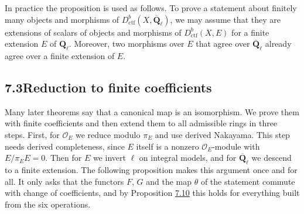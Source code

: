 \documentclass[11pt]{article}
\begin{document}
\label{bp631}%
In practice the proposition is used as follows. To prove a statement about finitely many objects and morphisms of \(D^b_{\mathrm{ctf}}(X,\overline{\mathbf Q}_\ell)\), we may assume that they are extensions of scalars of objects and morphisms of \(D^b_{\mathrm{ctf}}(X,E)\) for a finite extension \(E\) of \(\mathbf Q_\ell\). Moreover, two morphisms over \(E\) that agree over \(\overline{\mathbf Q}_\ell\) already agree over a finite extension of \(E\).


\subsection*{\texorpdfstring{7.3\quad Reduction to finite coefficients}{7.3 Reduction to finite coefficients}}
\label{bp632}%
\label{bp633}%
Many later theorems say that a canonical map is an isomorphism. We prove them with finite coefficients and then extend them to all admissible rings in three steps. First, for \(\mathcal O_E\) we reduce modulo \(\pi_E\) and use derived Nakayama. This step needs derived completeness, since \(E\) itself is a nonzero \(\mathcal O_E\)-module with \(E/\pi_E E=0\). Then for \(E\) we invert \(\ell\) on integral models, and for \(\overline{\mathbf Q}_\ell\) we descend to a finite extension. The following proposition makes this argument once and for all. It only asks that the functors \(F\), \(G\) and the map \(\theta\) of the statement commute with change of coefficients, and by Proposition \hyperref[bp626]{7.10} this holds for everything built from the six operations.
\end{document}
